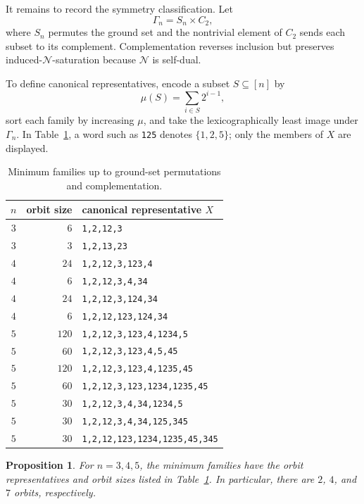 \documentclass[11pt]{amsart}
\newtheorem{proposition}[theorem]{Proposition}
\newcommand{\Nposet}{\mathcal N}
\begin{document}
It remains to record the symmetry classification. Let
\[
\Gamma_n=S_n\times C_2,
\]
where $S_n$ permutes the ground set and the nontrivial element of $C_2$ sends
each subset to its complement. Complementation reverses inclusion but
preserves induced-$\Nposet$-saturation because $\Nposet$ is self-dual.

To define canonical representatives, encode a subset $S\subseteq[n]$ by
\[
\mu(S)=\sum_{i\in S}2^{i-1},
\]
sort each family by increasing $\mu$, and take the lexicographically least
image under $\Gamma_n$. In Table~\ref{tab:orbits}, a word such as \texttt{125}
denotes $\{1,2,5\}$; only the members of $X$ are displayed.

\begin{table}[ht]
\centering
\small
\begin{tabular}{@{}crl@{}}
\toprule
$n$ & orbit size & canonical representative $X$ \\
\midrule
$3$ & $6$   & \texttt{1,2,12,3} \\
$3$ & $3$   & \texttt{1,2,13,23} \\
\addlinespace
$4$ & $24$  & \texttt{1,2,12,3,123,4} \\
$4$ & $6$   & \texttt{1,2,12,3,4,34} \\
$4$ & $24$  & \texttt{1,2,12,3,124,34} \\
$4$ & $6$   & \texttt{1,2,12,123,124,34} \\
\addlinespace
$5$ & $120$ & \texttt{1,2,12,3,123,4,1234,5} \\
$5$ & $60$  & \texttt{1,2,12,3,123,4,5,45} \\
$5$ & $120$ & \texttt{1,2,12,3,123,4,1235,45} \\
$5$ & $60$  & \texttt{1,2,12,3,123,1234,1235,45} \\
$5$ & $30$  & \texttt{1,2,12,3,4,34,1234,5} \\
$5$ & $30$  & \texttt{1,2,12,3,4,34,125,345} \\
$5$ & $30$  & \texttt{1,2,12,123,1234,1235,45,345} \\
\bottomrule
\end{tabular}
\caption{Minimum families up to ground-set permutations and complementation.}
\label{tab:orbits}
\end{table}

\begin{proposition}\label{prop:orbits}
For $n=3,4,5$, the minimum families have the orbit representatives and orbit
sizes listed in Table~\ref{tab:orbits}. In particular, there are $2$, $4$, and
$7$ orbits, respectively.
\end{proposition}
\end{document}
